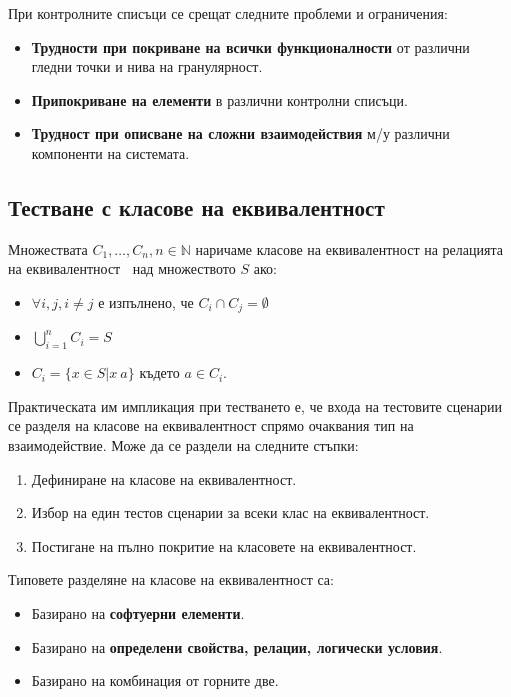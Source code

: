 \documentclass[fleqn,12pt]{article}
\begin{document}
При контролните списъци се срещат следните проблеми и ограничения:
\begin{itemize}
    \item \textbf{Трудности при покриване на всички функционалности} от различни гледни точки и нива на гранулярност.
    \item \textbf{Припокриване на елементи} в различни контролни списъци.
    \item \textbf{Трудност при описване на сложни взаимодействия} м/у различни компоненти на системата.
\end{itemize}

\subsection{Тестване с класове на еквивалентност}

Множествата $C_1, \dots, C_n, n \in \mathbb{N}$ наричаме класове на еквивалентност на релацията на еквивалентност $~$ над множеството $S$ ако:
\begin{itemize}
    \item $\forall i, j, i \neq j$ е изпълнено, че $C_i \cap C_j = \emptyset$
    \item $\bigcup\limits_{i=1}^{n} C_i = S$
    \item $C_i = \{x \in S | x ~ a\}$ където $a \in C_i$.
\end{itemize}

Практическата им импликация при тестването е, че входа на тестовите сценарии се разделя на класове на еквивалентност спрямо очаквания тип на взаимодействие.
Може да се раздели на следните стъпки:
\begin{enumerate}
    \item Дефиниране на класове на еквивалентност.
    \item Избор на един тестов сценарии за всеки клас на еквивалентност.
    \item Постигане на пълно покритие на класовете на еквивалентност.
\end{enumerate}

Типовете разделяне на класове на еквивалентност са:
\begin{itemize}
    \item Базирано на \textbf{софтуерни елементи}.
    \item Базирано на \textbf{определени свойства, релации, логически условия}.
    \item Базирано на комбинация от горните две.
\end{itemize}
\end{document}
